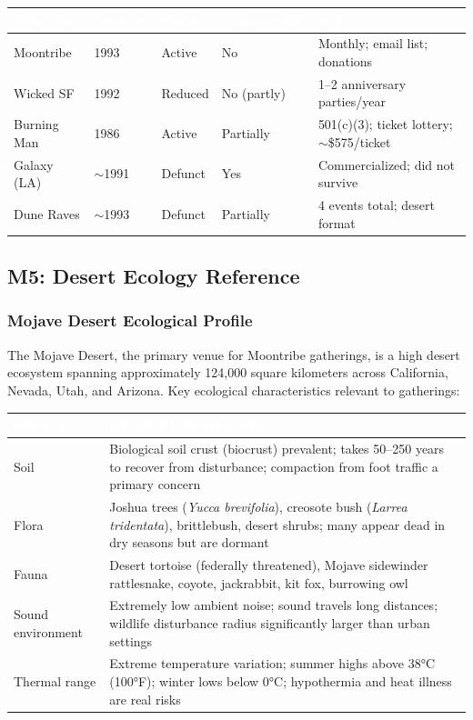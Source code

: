 \documentclass[11pt,letterpaper]{article}
\newcommand{\tableheader}[1]{\textbf{\sffamily\textcolor{white}{#1}}}
\begin{document}
\begin{center}
\begin{tabularx}{\textwidth}{L{2.5cm}C{1.5cm}C{1.5cm}C{2cm}L{3.5cm}}
\toprule
{}
\tableheader{Collective} & \tableheader{Founded} & \tableheader{Status} & \tableheader{Commercial?} & \tableheader{Notes} \\
\midrule
Moontribe & 1993 & Active & No & Monthly; email list; donations \\
Wicked SF & 1992 & Reduced & No (partly) & 1--2 anniversary parties/year \\
Burning Man & 1986 & Active & Partially & 501(c)(3); ticket lottery; $\sim$\$575/ticket \\
Galaxy (LA) & $\sim$1991 & Defunct & Yes & Commercialized; did not survive \\
Dune Raves & $\sim$1993 & Defunct & Partially & 4 events total; desert format \\
\bottomrule
\end{tabularx}
\end{center}

\subsection{M5: Desert Ecology Reference}

\subsubsection{Mojave Desert Ecological Profile}

The Mojave Desert, the primary venue for Moontribe gatherings, is a high desert ecosystem spanning approximately 124,000 square kilometers across California, Nevada, Utah, and Arizona. Key ecological characteristics relevant to gatherings:

\begin{center}
\begin{tabularx}{\textwidth}{L{3cm}X}
\toprule
{}
\tableheader{Element} & \tableheader{Relevant Characteristics} \\
\midrule
Soil & Biological soil crust (biocrust) prevalent; takes 50--250 years to recover from disturbance; compaction from foot traffic a primary concern \\
Flora & Joshua trees (\textit{Yucca brevifolia}), creosote bush (\textit{Larrea tridentata}), brittlebush, desert shrubs; many appear dead in dry seasons but are dormant \\
Fauna & Desert tortoise (federally threatened), Mojave sidewinder rattlesnake, coyote, jackrabbit, kit fox, burrowing owl \\
Sound environment & Extremely low ambient noise; sound travels long distances; wildlife disturbance radius significantly larger than urban settings \\
Thermal range & Extreme temperature variation; summer highs above 38°C (100°F); winter lows below 0°C; hypothermia and heat illness are real risks \\
\bottomrule
\end{tabularx}
\end{center}
\end{document}
